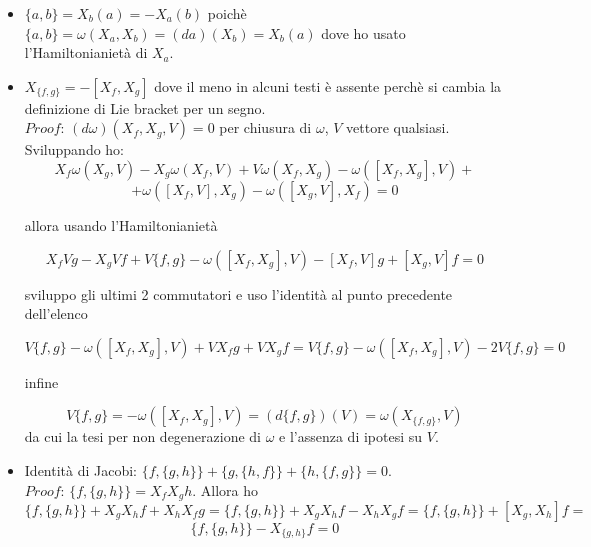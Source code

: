 \documentclass[]{article}
\newcommand{\w}{\omega}
\begin{document}
\begin{itemize}
	\item $\{a,b\} = X_b(a) = -X_a(b)$ poichè $\{a,b\} = \w(X_a,X_b) = (da)(X_b) = X_b(a)$ dove ho usato l'Hamiltonianietà di $X_a$.
	\item $X_{\{f,g\}} = - [X_f, X_g]$ dove il meno in alcuni testi è assente perchè si cambia la definizione di Lie bracket per un segno.\\
	$Proof$:
	$(d\w)(X_f,X_g,V) = 0$ per chiusura di $\w$, $V$ vettore qualsiasi. Sviluppando ho:
	$$X_f\w(X_g,V) - X_g\w(X_f,V) + V \w(X_f,X_g) - \w([X_f,X_g], V) +$$
	$$+ \w([X_f,V],X_g) - \w([X_g,V],X_f) = 0$$
	\begin{center}
		allora usando l'Hamiltonianietà
	\end{center}
	$$X_fVg - X_gVf + V\{f,g\} - \w([X_f,X_g],V) - [X_f,V]g + [X_g,V]f = 0$$
	\begin{center}
		sviluppo gli ultimi 2 commutatori e uso l'identità al punto precedente dell'elenco
	\end{center}
	$$V\{f,g\} - \w([X_f,X_g],V) + VX_f g + VX_gf = V\{f,g\} - \w([X_f,X_g],V) - 2 V\{f,g\} = 0$$
	\begin{center}
		infine
	\end{center}
	$$V\{f,g\} = - \w([X_f,X_g], V) = (d\{f,g\})(V) = \w(X_{\{f,g\}}, V)$$
	da cui la tesi per non degenerazione di $\w$ e l'assenza di ipotesi su $V$.
	\item Identità di Jacobi: $\{f,\{g,h\}\} + \{g,\{h,f\}\} + \{h,\{f,g\}\} = 0$.\\
	$Proof$:
	$\{f,\{g,h\}\} = X_fX_gh$. Allora ho
	$$\{f,\{g,h\}\} + X_gX_hf + X_hX_fg = \{f,\{g,h\}\} + X_gX_hf - X_hX_gf = \{f,\{g,h\}\} + [X_g,X_h]f = $$
	$$\{f,\{g,h\}\} - X_{\{g,h\}}f = 0$$
\end{itemize}
\end{document}
